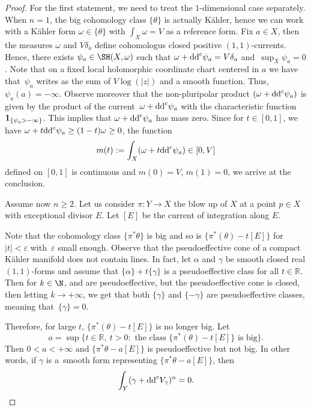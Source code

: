\begin{proof} For the first statement, we need to treat the $1$-dimensional case separately. When $n=1$, the big cohomology class $\{\theta\}$ is actually K\"ahler, hence we can work with a K\"ahler form $\omega\in \{\theta\}$ with $\int_X \omega = V$ as a reference form.
Fix $a\in X$, then the measures $\omega$ and $V \delta_a$ define cohomologus closed positive $(1,1)$-currents. Hence, there exists $\psi_a \in \SH(X,\omega)$ such that $\omega + {\rm dd}^c \psi_a = V \delta_a$ and~$\sup_X \psi_a = 0$.
Note that on a fixed local holomorphic coordinate chart centered in $a$ we have that~$\psi_a $ writes as the sum of $ V \log(|z|)$ and a smooth function. Thus, $ \psi_a(a) = - \infty$. Observe moreover that the non-pluripolar product $( \omega + {\rm dd}^c \psi_a)$ is given by the product of the current~${\omega + {\rm dd}^c \psi_a}$ with the characteristic function $ {\bf 1}_{ \{ \psi_a > - \infty \} }$. This implies that $\omega + {\rm dd}^c \psi_a$ has mass zero. Since for $t \in [0,1]$, we have $ \omega +t {\rm dd}^c \psi_a \geq (1-t) \omega \geq 0$, the function
\[m(t):= \int_X (\omega+t{\rm dd}^c\psi_a)\in [0, V]\]
 defined on $[0,1]$ is continuous and $m(0)=V$, $m(1)=0$, we arrive at the conclusion.

Assume now $n\geq 2$. Let us consider $\pi \colon Y \to X$ the blow up of $X$ at a point $p \in X$ with exceptional divisor $E$. Let $[E]$ be the current of integration along $E$.

Note that the cohomology class $\{ \pi^*\theta \} $ is big and so is $\{\pi^*(\theta) - t [E]\}$ for $ |t| < \varepsilon$ with~$\varepsilon$ small enough.
Observe that the pseudoeffective cone of a compact K\"ahler manifold does not contain lines. In fact, let $\alpha $ and $\gamma$ be smooth closed real $(1,1)$-forms and assume that
${\{ \alpha \} + t \{ \gamma \}}$ is a pseudoeffective class for all
$t \in \mathbb{R}$.
Then for $k \in { \N}$,  and  are pseudoeffective, but the pseudoeffective cone is closed, then letting $k\rightarrow +\infty$, we get that both
$\{ \gamma \}$ and $\{ - \gamma \} $ are pseudoeffective classes, meaning that~${\{ \gamma \} = 0}$.

Therefore, for large $t$, $\{\pi^*(\theta) - t [E] \}$ is no longer big. Let
\[a = \sup \{ t \in \mathbb{R}, \ t > 0 \colon \mbox{ the class $\{ \pi^*(\theta) - t[E] \}$ is big} \}.
\]
Then $ 0< a < +\infty $ and
$\{\pi^*\theta - a [E]\}$ is pseudoeffective but not big.
In other words, if $\gamma$ is a~smooth form representing
$\{ \pi^*\theta - a [E] \}$, then
\[\int_Y (\gamma+{\rm dd}^c V_\gamma)^n = 0. \]


\end{proof}
